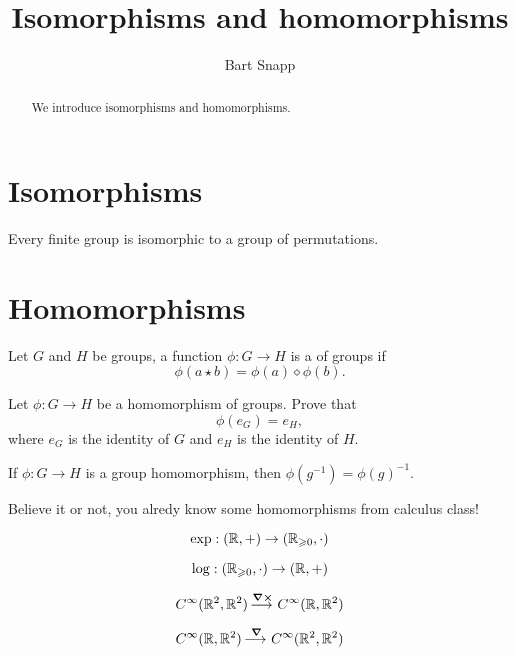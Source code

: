 \documentclass{ximera}
\author{Bart Snapp}
\title{Isomorphisms and homomorphisms}
\begin{document}
\begin{abstract}
  We introduce isomorphisms and homomorphisms.
\end{abstract}
\maketitle



\section{Isomorphisms}


\begin{theorem}[Cayley]
  Every finite group is isomorphic to a group of permutations.
\end{theorem}



\section{Homomorphisms}

\begin{definition}
  Let $G$ and $H$ be groups, a function $\phi:G\to H$ is a
   of groups if
  \[
  \phi(a\star b) = \phi(a)\diamond\phi(b).
  \]
\end{definition}

\begin{exercise}
  Let $\phi:G\to H$ be a homomorphism of groups. Prove that
  \[
  \phi(e_G) = e_H,
  \]
  where $e_G$ is the identity of $G$ and $e_H$ is the identity of
  $H$.
\end{exercise}



\begin{lemma}
  If $\phi:G\to H$ is a group homomorphism, then $\phi(g^{-1}) =
  \phi(g)^{-1}$.
\end{lemma}




Believe it or not, you alredy know some homomorphisms from calculus
class!

\[
\exp:(\mathbb R,+) \to (\mathbb R_{\geqslant 0},\cdot)
\]

\[
\log:(\mathbb R_{\geqslant 0},\cdot) \to (\mathbb R,+)
\]

\[
C^\infty(\mathbb R^2,\mathbb R^2) \mathop{\longrightarrow\,}\limits^{\boldsymbol{\nabla\times}} C^\infty(\mathbb R,\mathbb R^2)
\]


\[
C^\infty(\mathbb R,\mathbb R^2) \mathop{\longrightarrow\,}\limits^{\boldsymbol\nabla} C^\infty(\mathbb R^2,\mathbb R^2)
\]
\end{document}
